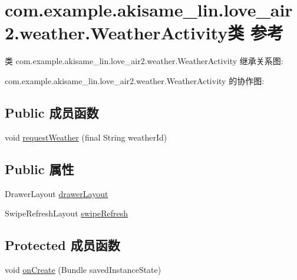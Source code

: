 \hypertarget{classcom_1_1example_1_1akisame__lin_1_1love__air2_1_1weather_1_1_weather_activity}{}\section{com.\+example.\+akisame\+\_\+lin.\+love\+\_\+air2.\+weather.\+Weather\+Activity类 参考}
\label{classcom_1_1example_1_1akisame__lin_1_1love__air2_1_1weather_1_1_weather_activity}


类 com.\+example.\+akisame\+\_\+lin.\+love\+\_\+air2.\+weather.\+Weather\+Activity 继承关系图\+:


com.\+example.\+akisame\+\_\+lin.\+love\+\_\+air2.\+weather.\+Weather\+Activity 的协作图\+:
\subsection*{Public 成员函数}
\begin{DoxyCompactItemize}
\item 
void \mbox{\hyperlink{classcom_1_1example_1_1akisame__lin_1_1love__air2_1_1weather_1_1_weather_activity_a2744f92045d108b8f464f5774d518dcf}{request\+Weather}} (final String weather\+Id)
\end{DoxyCompactItemize}
\subsection*{Public 属性}
\begin{DoxyCompactItemize}
\item 
Drawer\+Layout \mbox{\hyperlink{classcom_1_1example_1_1akisame__lin_1_1love__air2_1_1weather_1_1_weather_activity_adb90684bf2a4adc4de0bbd1b64f57322}{drawer\+Layout}}
\item 
Swipe\+Refresh\+Layout \mbox{\hyperlink{classcom_1_1example_1_1akisame__lin_1_1love__air2_1_1weather_1_1_weather_activity_a971bcf66d127e96be776d48abf50a640}{swipe\+Refresh}}
\end{DoxyCompactItemize}
\subsection*{Protected 成员函数}
\begin{DoxyCompactItemize}
\item 
void \mbox{\hyperlink{classcom_1_1example_1_1akisame__lin_1_1love__air2_1_1weather_1_1_weather_activity_a3f73843adacb16a156d966098287d46f}{on\+Create}} (Bundle saved\+Instance\+State)
\end{DoxyCompactItemize}
